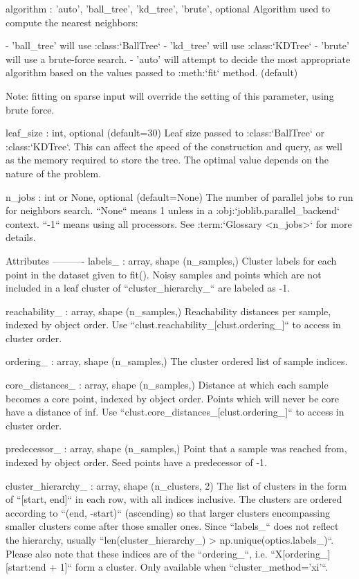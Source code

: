 \begin{DoxyVerb}
algorithm : {'auto', 'ball_tree', 'kd_tree', 'brute'}, optional
    Algorithm used to compute the nearest neighbors:

    - 'ball_tree' will use :class:`BallTree`
    - 'kd_tree' will use :class:`KDTree`
    - 'brute' will use a brute-force search.
    - 'auto' will attempt to decide the most appropriate algorithm
      based on the values passed to :meth:`fit` method. (default)

    Note: fitting on sparse input will override the setting of
    this parameter, using brute force.

leaf_size : int, optional (default=30)
    Leaf size passed to :class:`BallTree` or :class:`KDTree`. This can
    affect the speed of the construction and query, as well as the memory
    required to store the tree. The optimal value depends on the
    nature of the problem.

n_jobs : int or None, optional (default=None)
    The number of parallel jobs to run for neighbors search.
    ``None`` means 1 unless in a :obj:`joblib.parallel_backend` context.
    ``-1`` means using all processors. See :term:`Glossary <n_jobs>`
    for more details.

Attributes
----------
labels_ : array, shape (n_samples,)
    Cluster labels for each point in the dataset given to fit().
    Noisy samples and points which are not included in a leaf cluster
    of ``cluster_hierarchy_`` are labeled as -1.

reachability_ : array, shape (n_samples,)
    Reachability distances per sample, indexed by object order. Use
    ``clust.reachability_[clust.ordering_]`` to access in cluster order.

ordering_ : array, shape (n_samples,)
    The cluster ordered list of sample indices.

core_distances_ : array, shape (n_samples,)
    Distance at which each sample becomes a core point, indexed by object
    order. Points which will never be core have a distance of inf. Use
    ``clust.core_distances_[clust.ordering_]`` to access in cluster order.

predecessor_ : array, shape (n_samples,)
    Point that a sample was reached from, indexed by object order.
    Seed points have a predecessor of -1.

cluster_hierarchy_ : array, shape (n_clusters, 2)
    The list of clusters in the form of ``[start, end]`` in each row, with
    all indices inclusive. The clusters are ordered according to
    ``(end, -start)`` (ascending) so that larger clusters encompassing
    smaller clusters come after those smaller ones. Since ``labels_`` does
    not reflect the hierarchy, usually
    ``len(cluster_hierarchy_) > np.unique(optics.labels_)``. Please also
    note that these indices are of the ``ordering_``, i.e.
    ``X[ordering_][start:end + 1]`` form a cluster.
    Only available when ``cluster_method='xi'``.


\end{DoxyVerb}
